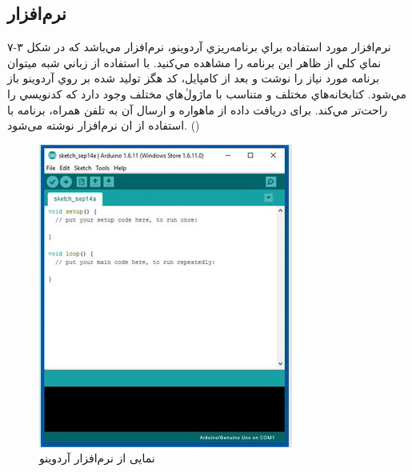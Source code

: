 \subsection{نرم‌افزار }
نرم‌افزار مورد استفاده براي برنامه‌ريزي آردوينو، نرم‌افزار   مي‌باشد كه در شکل ۳-۷ نماي كلي از ظاهر اين برنامه را مشاهده مي‌كنيد. با استفاده از زباني شبه  ميتوان برنامه مورد نياز را نوشت و بعد از كامپايل، كد هگز توليد شده بر روي آردوينو باز مي‌شود. كتابخانه‌هاي مختلف و متناسب با ماژولٰ‌هاي مختلف وجود دارد كه كدنويسي را راحت‌تر مي‌كند. برای دریافت داده از ماهواره و ارسال آن به تلفن همراه، برنامه با استفاده از ان نرم‌افزار نوشته می‌شود. ()
\begin{figure}[!h]
	\centerline{\includegraphics[width=.4\textwidth]{arduino-ide}}
	\caption{نمایی از نرم‌افزار آردوینو}
\end{figure}
\subsection{}